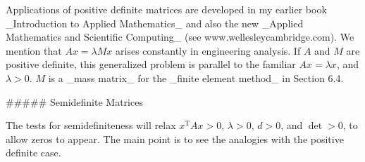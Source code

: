 Applications of positive definite matrices are developed in my earlier book _Introduction to Applied Mathematics_ and also the new _Applied Mathematics and Scientific Computing_ (see www.wellesleycambridge.com). We mention that \(Ax=\lambda Mx\) arises constantly in engineering analysis. If \(A\) and \(M\) are positive definite, this generalized problem is parallel to the familiar \(Ax=\lambda x\), and \(\lambda>0\). \(M\) is a _mass matrix_ for the _finite element method_ in Section 6.4.

##### Semidefinite Matrices

The tests for semidefiniteness will relax \(x^{\mathrm{T}}Ax>0\), \(\lambda>0\), \(d>0\), and \(\det>0\), to allow zeros to appear. The main point is to see the analogies with the positive definite case.

 